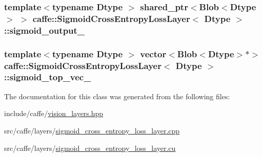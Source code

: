 \hypertarget{classcaffe_1_1_sigmoid_cross_entropy_loss_layer_a1eb4c2e90dd4807dbfb0806a411a7bea}{
\subsubsection[{sigmoid\+\_\+output\+\_\+}]{\setlength{\rightskip}{0pt plus 5cm}template$<$typename Dtype $>$ shared\+\_\+ptr$<${\bf Blob}$<$Dtype$>$ $>$ {\bf caffe\+::\+Sigmoid\+Cross\+Entropy\+Loss\+Layer}$<$ Dtype $>$\+::sigmoid\+\_\+output\+\_\+\hspace{0.3cm}{\ttfamily [protected]}}}\label{classcaffe_1_1_sigmoid_cross_entropy_loss_layer_a1eb4c2e90dd4807dbfb0806a411a7bea}
\hypertarget{classcaffe_1_1_sigmoid_cross_entropy_loss_layer_af6719c9685fcf910129db20cceb47be5}{
\subsubsection[{sigmoid\+\_\+top\+\_\+vec\+\_\+}]{\setlength{\rightskip}{0pt plus 5cm}template$<$typename Dtype $>$ vector$<${\bf Blob}$<$Dtype$>$$\ast$$>$ {\bf caffe\+::\+Sigmoid\+Cross\+Entropy\+Loss\+Layer}$<$ Dtype $>$\+::sigmoid\+\_\+top\+\_\+vec\+\_\+\hspace{0.3cm}{\ttfamily [protected]}}}\label{classcaffe_1_1_sigmoid_cross_entropy_loss_layer_af6719c9685fcf910129db20cceb47be5}


The documentation for this class was generated from the following files\+:\begin{DoxyCompactItemize}
\item 
include/caffe/\hyperlink{vision__layers_8hpp}{vision\+\_\+layers.\+hpp}\item 
src/caffe/layers/\hyperlink{sigmoid__cross__entropy__loss__layer_8cpp}{sigmoid\+\_\+cross\+\_\+entropy\+\_\+loss\+\_\+layer.\+cpp}\item 
src/caffe/layers/\hyperlink{sigmoid__cross__entropy__loss__layer_8cu}{sigmoid\+\_\+cross\+\_\+entropy\+\_\+loss\+\_\+layer.\+cu}\end{DoxyCompactItemize}
